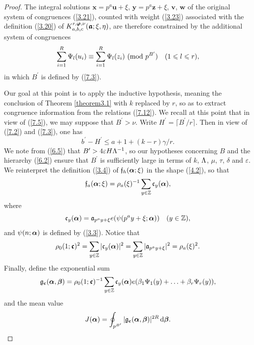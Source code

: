 \documentclass[12pt,reqno]{amsart}
\theoremstyle{definition}
\theoremstyle{remark}
\numberwithin{equation}{section}
\newcommand{\mmod}[1]{\,\,(\text{\rm mod}\,\,#1)}
\def\bfu{{\mathbf u}}
\def\bfv{{\mathbf v}}
\def\bfw{{\mathbf w}}
\def\bfx{{\mathbf x}}
\def\bfy{{\mathbf y}}
\def\bfz{{\mathbf z}}
\def\dbZ{{\mathbb Z}}\def\dbQ{{\mathbb Q}}
\def\gra{{\mathfrak a}}\def\grA{{\mathfrak A}}\def\bfgra{{\boldsymbol \gra}}
\def\grc{{\mathfrak c}}\def\grC{{\mathfrak C}}\def\bfgrc{{\boldsymbol \grc}}
\def\grf{{\mathfrak f}}\def\grF{{\mathfrak F}}
\def\grg{{\mathfrak g}}\def\grG{{\mathfrak G}}
\def\bet{{\beta}}  \def\bfbet{{\boldsymbol \beta}}
\def\gam{{\gamma}} \def\Gam{{\Gamma}}
\def\del{{\delta}} \def\Del{{\Delta}} \def\Deltil{{\widetilde \Delta}}
\def\eps{\varepsilon}
\def\le{\leqslant} \def\ge{\geqslant} \def\pleq{\preccurlyeq} \def\ple{\prec}
\def\d{{\,{\rm d}}}
\begin{document}
\begin{proof}
The integral solutions $\bfx=p^a\bfu+\xi$, $\bfy=p^a\bfz+\xi$, $\bfv$, $\bfw$ of the 
original system of congruences (\ref{3.21}), counted with weight (\ref{3.23}) associated 
with the definition (\ref{3.20}) of $K_{a,b,c}^{r,\bfvarphi,\nu}(\bfgra;\xi,\eta)$, are 
therefore constrained by the additional system of congruences
\begin{equation}\label{7.12}
\sum_{i=1}^R\Psi_l(u_i)\equiv \sum_{i=1}^R\Psi_l(z_i)\mmod{p^{B^\prime}}\quad 
(1\le l\le r),
\end{equation}
in which $B^\prime$ is defined by (\ref{7.3}).\par

Our goal at this point is to apply the inductive hypothesis, meaning the conclusion of 
Theorem \ref{theorem3.1} with $k$ replaced by $r$, so as to extract congruence 
information from the relations (\ref{7.12}). We recall at this point that in view of 
(\ref{7.5}), we may suppose that $B^\prime >\nu$. Write 
$H^\prime =\lceil B^\prime /r\rceil $. Then in view of (\ref{7.2}) and (\ref{7.3}), one has
\begin{equation}\label{7.13}
b^\prime-H^\prime\le a+1+(k-r)\gam/r.
\end{equation}
We note from (\ref{6.5}) that $B'>4\eps H\Lam^{-1}$, so our hypotheses concerning $B$ 
and the hierarchy (\ref{6.2}) ensure that $B^\prime$ is sufficiently large in terms of $k$, 
${\Lambda}$, $\mu$, $\tau$, $\del$ and $\eps$. We reinterpret the definition (\ref{3.4}) of 
$\grf_h(\bfalp;\xi)$ in the shape (\ref{4.2}), so that
\begin{equation}\label{7.14}
\grf_a(\bfalp;\xi)=\rho_a(\xi)^{-1}\sum_{y\in \dbZ}\grc_y(\bfalp),
\end{equation}
where
$$\grc_y(\bfalp)=\gra_{p^ay+\xi}e(\psi(p^ay+\xi;\bfalp))\quad (y\in \dbZ),$$
and $\psi(n;{\boldsymbol \alpha})$ is defined by (\ref{3.3}). Notice that
\begin{equation}\label{7.15}
\rho_0(1;\bfgrc)^2=\sum_{y\in \dbZ}|\grc_y(\bfalp)|^2=\sum_{y\in \dbZ}
|\gra_{p^ay+\xi}|^2=\rho_a(\xi)^2.
\end{equation}
Finally, define the exponential sum
\begin{equation}\label{7.16}
\grg_\bfgrc(\bfalp,\bfbet)=\rho_0(1;\bfgrc)^{-1}\sum_{y\in \dbZ}\grc_y(\bfalp) 
e(\bet_1\Psi_1(y)+\ldots +\bet_r\Psi_r(y)),
\end{equation}
and the mean value
$$J(\bfalp)=\oint_{p^{B^\prime}}|\grg_\bfgrc(\bfalp,\bfbet)|^{2R}\d\bfbet .$$


\end{proof}
\end{document}
